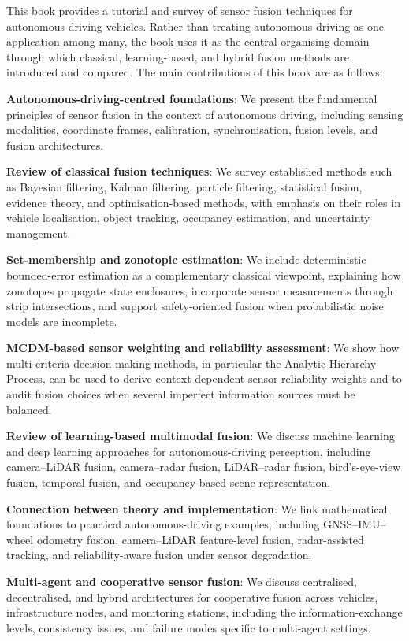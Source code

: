 This book provides a tutorial and survey of sensor fusion techniques for autonomous driving vehicles. Rather than treating autonomous driving as one application among many, the book uses it as the central organising domain through which classical, learning-based, and hybrid fusion methods are introduced and compared. The main contributions of this book are as follows:
\begin{list4a}
    \item \textbf{Autonomous-driving-centred foundations}: We present the fundamental principles of sensor fusion in the context of autonomous driving, including sensing modalities, coordinate frames, calibration, synchronisation, fusion levels, and fusion architectures.
    \item \textbf{Review of classical fusion techniques}: We survey established methods such as Bayesian filtering, Kalman filtering, particle filtering, statistical fusion, evidence theory, and optimisation-based methods, with emphasis on their roles in vehicle localisation, object tracking, occupancy estimation, and uncertainty management.
    \item \textbf{Set-membership and zonotopic estimation}: We include deterministic bounded-error estimation as a complementary classical viewpoint, explaining how zonotopes propagate state enclosures, incorporate sensor measurements through strip intersections, and support safety-oriented fusion when probabilistic noise models are incomplete.
    \item \textbf{MCDM-based sensor weighting and reliability assessment}: We show how multi-criteria decision-making methods, in particular the Analytic Hierarchy Process, can be used to derive context-dependent sensor reliability weights and to audit fusion choices when several imperfect information sources must be balanced.
    \item \textbf{Review of learning-based multimodal fusion}: We discuss machine learning and deep learning approaches for autonomous-driving perception, including camera--LiDAR fusion, camera--radar fusion, LiDAR--radar fusion, bird's-eye-view fusion, temporal fusion, and occupancy-based scene representation.
    \item \textbf{Connection between theory and implementation}: We link mathematical foundations to practical autonomous-driving examples, including GNSS--IMU--wheel odometry fusion, camera--LiDAR feature-level fusion, radar-assisted tracking, and reliability-aware fusion under sensor degradation.
    \item \textbf{Multi-agent and cooperative sensor fusion}: We discuss centralised, decentralised, and hybrid architectures for cooperative fusion across vehicles, infrastructure nodes, and monitoring stations, including the information-exchange levels, consistency issues, and failure modes specific to multi-agent settings.

\end{list4a}
